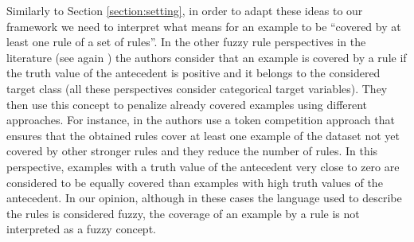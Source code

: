 Similarly to Section \ref{section:setting}, in order to adapt these ideas to our framework we need to interpret what means for an example to be ``covered by at least one rule of a set of rules''. In the other fuzzy rule perspectives in the literature (see again \cite{Carmona2010,Carmona2011,Luna2014,Carmona2015,Berlanga2006,delJesus2007B,delJesus2007}) the authors consider that an example is covered by a rule if the truth value of the antecedent is positive and it belongs to the considered target class (all these perspectives consider categorical target variables).  They then use this concept to penalize already covered examples using different approaches. For instance, in \cite{Carmona2015} the authors use a token competition approach that ensures that the obtained rules cover at least one example of the dataset not yet covered by other stronger rules and they reduce the number of rules. In this perspective, examples with a truth value of the antecedent very close to zero are considered to be equally covered than examples with high truth values of the antecedent. In our opinion, although in these cases the language used to describe the rules is considered fuzzy, the coverage of an example by a rule is not interpreted as a fuzzy concept. 

